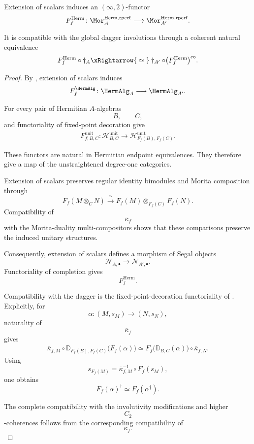 \begin{theorem}
\label{thm:base-change-hermitian-morita-category}
Extension of scalars induces an $(\infty,2)$-functor
\[
    F_f^{\mathrm{Herm}}
    \colon
    \Mor_A^{\mathrm{Herm,rperf}}
    \longrightarrow
    \Mor_{A'}^{\mathrm{Herm,rperf}}.
\]

It is compatible with the global dagger involutions through a coherent
natural equivalence
\[
    F_f^{\mathrm{Herm}}
    \circ
    \dagger_A
    \xRightarrow{\;\simeq\;}
    \dagger_{A'}
    \circ
    \bigl(
        F_f^{\mathrm{Herm}}
    \bigr)^{\mathrm{co}}.
\]
\end{theorem}

\begin{proof}
By
,
extension of scalars induces
\[
    F_f^{\HermAlg}
    \colon
    \HermAlg_A
    \longrightarrow
    \HermAlg_{A'}.
\]

For every pair of Hermitian $A$-algebras
\[
    B,
    \qquad
    C,
\]
and functoriality of fixed-point decoration give
\[
\begin{aligned}
    F_{f;B,C}^{\mathrm{unit}}
    \colon
    \mathcal H^{\mathrm{unit}}_{B,C}
    \longrightarrow
    \mathcal H^{\mathrm{unit}}_{F_f(B),F_f(C)}.
\end{aligned}
\]

These functors are natural in Hermitian endpoint equivalences. They
therefore give a map of the unstraightened degree-one categories.

Extension of scalars preserves regular identity bimodules and Morita
composition through
\[
    F_f(M\otimes_CN)
    \xrightarrow{\;\simeq\;}
    F_f(M)
    \otimes_{F_f(C)}
    F_f(N).
\]
Compatibility of
\[
    \overline\kappa_f
\]
with the Morita-duality multi-compositors shows that these comparisons
preserve the induced unitary structures.

Consequently, extension of scalars defines a morphism of Segal objects
\[
    \mathcal N_{A,\bullet}
    \longrightarrow
    \mathcal N_{A',\bullet}.
\]
Functoriality of completion gives
\[
    F_f^{\mathrm{Herm}}.
\]

Compatibility with the dagger is the fixed-point-decoration
functoriality of
.
Explicitly, for
\[
    \alpha
    \colon
    (M,s_M)
    \longrightarrow
    (N,s_N),
\]
naturality of
\[
    \overline\kappa_f
\]
gives
\[
\begin{aligned}
    \overline\kappa_{f,M}
    \circ
    \mathbb D_{F_f(B),F_f(C)}
    \bigl(
        F_f(\alpha)
    \bigr)
    \simeq
    F_f
    \bigl(
        \mathbb D_{B,C}(\alpha)
    \bigr)
    \circ
    \overline\kappa_{f,N}.
\end{aligned}
\]
Using
\[
    s_{F_f(M)}
    =
    \overline\kappa_{f,M}^{-1}
    \circ
    F_f(s_M),
\]
one obtains
\[
    F_f(\alpha)^\dagger
    \simeq
    F_f(\alpha^\dagger).
\]

The complete compatibility with the involutivity modifications and
higher
\[
    C_2
\]
-coherences follows from the corresponding compatibility of
\[
    \kappa_f.
\]
\end{proof}


